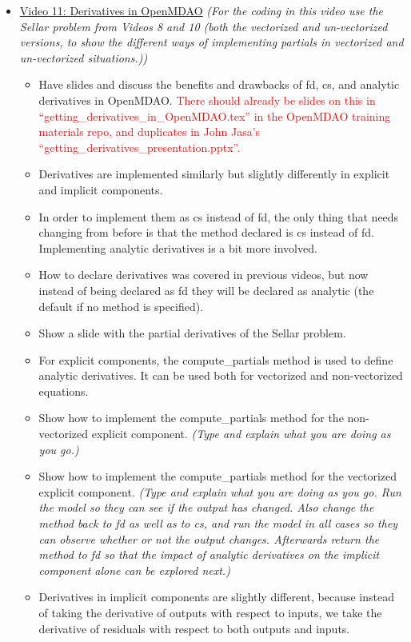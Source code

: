 \documentclass[12pt, letterpaper]{article}
\begin{document}
\begin{itemize}
	\item \underline{Video 11: Derivatives in OpenMDAO} \textit{(For the coding in this video use the Sellar problem from Videos 8 and 10 (both the vectorized and un-vectorized versions, to show the different ways of implementing partials in vectorized and un-vectorized situations.))}
		\begin{itemize}
			\item Have slides and discuss the benefits and drawbacks of fd, cs, and analytic derivatives in OpenMDAO. \textcolor{red}{There should already be slides on this in “getting\_derivatives\_in\_OpenMDAO.tex” in the OpenMDAO training materials repo, and duplicates in John Jasa’s “getting\_derivatives\_presentation.pptx”.}
			\item Derivatives are implemented similarly but slightly differently in explicit and implicit components. 
			\item In order to implement them as cs instead of fd, the only thing that needs changing from before is that the method declared is cs instead of fd. Implementing analytic derivatives is a bit more involved.
			\item How to declare derivatives was covered in previous videos, but now instead of being declared as fd they will be declared as analytic (the default if no method is specified).
			\item Show a slide with the partial derivatives of the Sellar problem.
			\item For explicit components, the compute\_partials method is used to define analytic derivatives. It can be used both for vectorized and non-vectorized equations.
			\item Show how to implement the compute\_partials method for the non-vectorized explicit component. \textit{(Type and explain what you are doing as you go.)}
			\item Show how to implement the compute\_partials method for the vectorized explicit component. \textit{(Type and explain what you are doing as you go. Run the model so they can see if the output has changed. Also change the method back to fd as well as to cs, and run the model in all cases so they can observe whether or not the output changes. Afterwards return the method to fd so that the impact of analytic derivatives on the implicit component alone can be explored next.)}
			\item Derivatives in implicit components are slightly different, because instead of taking the derivative of outputs with respect to inputs, we take the derivative of residuals with respect to both outputs and inputs.

\end{itemize}
\end{itemize}
\end{document}
